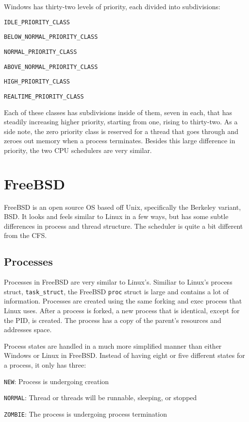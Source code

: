 \documentclass[10pt,letterpaper,onecolumn,draftclsnofoot]{IEEEtran}
\begin{document}
  Windows has thirty-two levels of priority, each divided into subdivisions:
  \begin{description}
    \item \texttt{IDLE\_PRIORITY\_CLASS}
    \item \texttt{BELOW\_NORMAL\_PRIORITY\_CLASS}
    \item \texttt{NORMAL\_PRIORITY\_CLASS}
    \item \texttt{ABOVE\_NORMAL\_PRIORITY\_CLASS}
    \item \texttt{HIGH\_PRIORITY\_CLASS}
    \item \texttt{REALTIME\_PRIORITY\_CLASS}
  \end{description}

  Each of these classes has subdivisions inside of them, seven in each, that
  has steadily increasing higher priority, starting from one, rising to thirty-two.
  As a side note, the zero priority class is reserved for a thread that goes through
  and zeroes out memory when a process terminates.\cite{msschedule2016} Besides
  this large difference in priority, the two CPU schedulers are very similar.

\section{FreeBSD}
FreeBSD is an open source OS based off Unix, specifically the Berkeley variant,
BSD. It looks and feels similar to Linux in a few ways, but has some subtle
differences in process and thread structure. The scheduler is quite a bit different
from the CFS.
  \subsection{Processes}
Processes in FreeBSD are very similar to Linux's. Similiar to Linux's process
struct, \texttt{task\_struct}, the FreeBSD \texttt{proc} struct is large and
contains a lot of information. Processes are created using the same forking and
exec process that Linux uses. After a process is forked, a new process that is
identical, except for the PID, is created. The process has a copy of the parent's
resources and addresses space.

Process states are handled in a much more simplified manner than either Windows
or Linux in FreeBSD. Instead of having eight or five different states for a process,
it only has three:
\begin{description}
  \item \texttt{NEW}: Process is undergoing creation
  \item \texttt{NORMAL}: Thread or threads will be runnable, sleeping, or stopped
  \item \texttt{ZOMBIE}: The process is undergoing process termination
\end{description}
\end{document}
